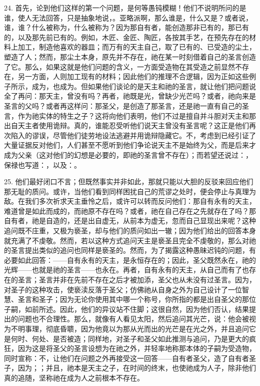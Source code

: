 24. 首先，论到他们这样的第一个问题，是何等愚钝模糊！他们不说明所问的是谁，使人无法回答，只是抽象地说，。亚略派啊，那么谁是，什么又是？或者说，谁，谁？什么被称为，什么被称为？因为那自有者，能创造那非已有的，那已有的，以及那先前已有的。例如，木匠、金匠、陶匠，各按其手艺，在预先存在的材料上加工，制造他喜欢的器皿；而万有的天主自己，取了已有的、已受造的尘土，塑造了人；然而，那尘土本身，原先并不存在，祂在某一时刻借着自己的圣言创造了它。那么，如果这就是他们问题的含义，一方面受造物在其受造之前显然不存在，另一方面，人则加工现有的材料；因此他们的推理不合逻辑，因为正如这些例子所示，成为，也成为。但如果他们谈论的是天主和祂的圣言，就让他们把问题说全了再问：那天主，曾没有吗？再者，祂既是光，曾缺少光芒吗？或者，祂向来是圣言的父吗？或者再这样问：那圣父，是创造了那圣言，还是祂一直有自己的圣言，作为祂实体的特生之子？这将向他们表明，他们不过是擅自并斗胆对天主和那出自天主者使用诡辩。真的，谁能忍受听他们说天主曾没有圣言呢？这正是他们再次陷入的谬误，尽管他们徒劳地设法逃避并用诡辩隐藏它。不，考虑到已经引证了大量证据反对他们，人们甚至不愿听到他们争论说天主不是始终为父，而是后来才成为父亲（这对他们的幻想是必要的，即祂的圣言曾不存在）；而若望还说过：，保禄也写道：，以及：。\par

25. 他们最好闭口不言；但既然事实并非如此，那就只能以大胆的反驳来回应他们那无耻的质问。或许，当他们看到同样困扰自己的荒谬之处时，便会停止与真理为敌。在我们多次祈求天主垂怜之后，或许可以转而反问他们：那自有永有的天主，难道曾是如此而成的，而祂原不存在吗？或者，祂在自己存在之先就存在了吗？那自有者，祂是自造的，还是出自虚无，从前本为虚无，忽而自己显现出来呢？这种追问既不庄重，又极为亵圣，却与他们的质问如出一辙；因为他们给出的回答本身就充满了不虔敬。然而，若以这种方式追问天主是亵圣且完全不虔敬的，那么对祂的圣言提出类似的追问也同样是亵圣的。然而，为了揭露这种愚昧迟钝的问题，有必要如此回答：——自有永有的天主，是永恒存在的；因此，圣父既然永在，祂的光辉——也就是祂的圣言——也永在。再者，自有永有的天主，从自己而有了也存在的圣言；圣言并非在先前不存在之后才被加添，圣父也从未没有过圣言。因为，对圣子的这种攻击，使亵渎反落于圣父；仿佛祂从自身之外为自己设计了一位智慧、圣言和圣子；因为无论你使用其中哪一个称号，你所指的都是出自圣父的那位子嗣，如前所述。因此，他们的异议站不住脚；这很自然，因为他们否认，结果提出的问题也不合理性。那么，就像有人看见太阳，然后追问其光芒，说：他会被视为不明事理，彻底昏聩，因为他竟以为那从光而出的光芒是在光之外，并且追问它是何时、何处、是否被造；同样地，对圣子和圣父如此推测与追问，乃是更大的疯狂，因为这是将圣父的圣言设想为在祂之外，并轻率地称那本体的子嗣为受造物，同时宣称：不，让他们在问题之外再接受这一回答——自有者圣父，造了自有者圣子，因为；；并且，祂本是天主之子，在时间的终末，也使祂成为人子，除非他们真的追随，坚称祂在成为人之前根本不存在。\par

